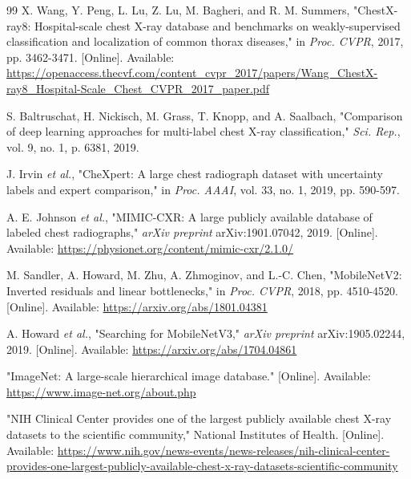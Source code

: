 \documentclass[12pt]{article}
\begin{document}
\vspace{200pt}

\pagebreak

\begin{thebibliography}{99}
X. Wang, Y. Peng, L. Lu, Z. Lu, M. Bagheri, and R. M. Summers, "ChestX-ray8: Hospital-scale chest X-ray database and benchmarks on weakly-supervised classification and localization of common thorax diseases," in \textit{Proc. CVPR}, 2017, pp. 3462-3471. [Online]. Available: \url{https://openaccess.thecvf.com/content_cvpr_2017/papers/Wang_ChestX-ray8_Hospital-Scale_Chest_CVPR_2017_paper.pdf}

S. Baltruschat, H. Nickisch, M. Grass, T. Knopp, and A. Saalbach, "Comparison of deep learning approaches for multi-label chest X-ray classification," \textit{Sci. Rep.}, vol. 9, no. 1, p. 6381, 2019.

J. Irvin \textit{et al.}, "CheXpert: A large chest radiograph dataset with uncertainty labels and expert comparison," in \textit{Proc. AAAI}, vol. 33, no. 1, 2019, pp. 590-597.

A. E. Johnson \textit{et al.}, "MIMIC-CXR: A large publicly available database of labeled chest radiographs," \textit{arXiv preprint} arXiv:1901.07042, 2019. [Online]. Available: \url{https://physionet.org/content/mimic-cxr/2.1.0/}

M. Sandler, A. Howard, M. Zhu, A. Zhmoginov, and L.-C. Chen, "MobileNetV2: Inverted residuals and linear bottlenecks," in \textit{Proc. CVPR}, 2018, pp. 4510-4520. [Online]. Available: \url{https://arxiv.org/abs/1801.04381}

A. Howard \textit{et al.}, "Searching for MobileNetV3," \textit{arXiv preprint} arXiv:1905.02244, 2019. [Online]. Available: \url{https://arxiv.org/abs/1704.04861}

"ImageNet: A large-scale hierarchical image database." [Online]. Available: \url{https://www.image-net.org/about.php}

"NIH Clinical Center provides one of the largest publicly available chest X-ray datasets to the scientific community," National Institutes of Health. [Online]. Available: \url{https://www.nih.gov/news-events/news-releases/nih-clinical-center-provides-one-largest-publicly-available-chest-x-ray-datasets-scientific-community}


\end{thebibliography}
\end{document}
